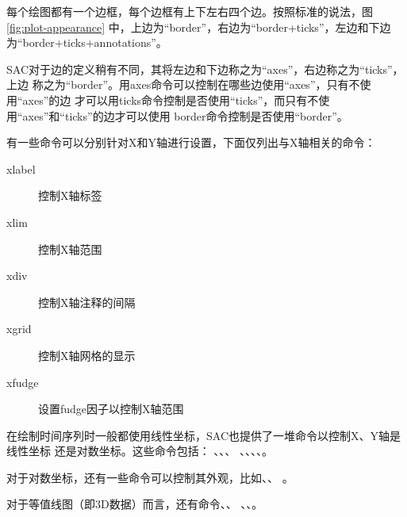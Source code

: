 每个绘图都有一个边框，每个边框有上下左右四个边。按照标准的说法，图\ref{fig:plot-appearance}
中，上边为``border''，右边为``border+ticks''，左边和下边为``border+ticks+annotations''。

SAC对于边的定义稍有不同，其将左边和下边称之为``axes''，右边称之为``ticks''，上边
称之为``border''。用axes命令可以控制在哪些边使用``axes''，只有不使用``axes''的边
才可以用ticks命令控制是否使用``ticks''，而只有不使用``axes''和``ticks''的边才可以使用
border命令控制是否使用``border''。

有一些命令可以分别针对X和Y轴进行设置，下面仅列出与X轴相关的命令：
\begin{description}
\item [xlabel] 控制X轴标签
\item [xlim] 控制X轴范围
\item [xdiv] 控制X轴注释的间隔
\item [xgrid] 控制X轴网格的显示
\item [xfudge] 设置fudge因子以控制X轴范围
\end{description}

在绘制时间序列时一般都使用线性坐标，SAC也提供了一堆命令以控制X、Y轴是线性坐标
还是对数坐标。这些命令包括： 、、、
、、、、。

对于对数坐标，还有一些命令可以控制其外观，比如、、
。

对于等值线图（即3D数据）而言，还有命令、、
、、。
